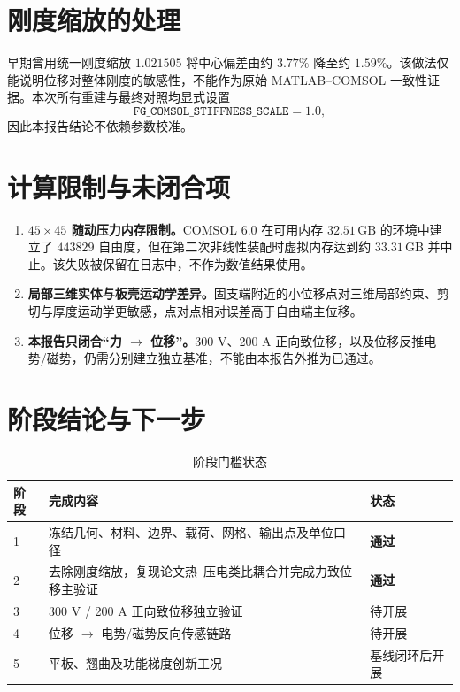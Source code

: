 \documentclass[UTF8,fontset=windows,12pt,a4paper]{ctexart}
\newcommand{\pass}{\textcolor{passgreen}{\textbf{通过}}}
\begin{document}
\section{刚度缩放的处理}

早期曾用统一刚度缩放 $1.021505$ 将中心偏差由约 $3.77\%$ 降至约 $1.59\%$。该做法仅能说明位移对整体刚度的敏感性，不能作为原始 MATLAB--COMSOL 一致性证据。本次所有重建与最终对照均显式设置
\[
  \texttt{FG\_COMSOL\_STIFFNESS\_SCALE}=1.0,
\]
因此本报告结论不依赖参数校准。

\section{计算限制与未闭合项}

\begin{enumerate}[label=\arabic*.]
  \item \textbf{$45\times45$ 随动压力内存限制。}COMSOL 6.0 在可用内存 $32.51\,\mathrm{GB}$ 的环境中建立了 $443829$ 自由度，但在第二次非线性装配时虚拟内存达到约 $33.31\,\mathrm{GB}$ 并中止。该失败被保留在日志中，不作为数值结果使用。
  \item \textbf{局部三维实体与板壳运动学差异。}固支端附近的小位移点对三维局部约束、剪切与厚度运动学更敏感，点对点相对误差高于自由端主位移。
  \item \textbf{本报告只闭合“力 $\rightarrow$ 位移”。}300 V、200 A 正向致位移，以及位移反推电势/磁势，仍需分别建立独立基准，不能由本报告外推为已通过。
\end{enumerate}

\section{阶段结论与下一步}

\begin{table}[H]
\centering
\caption{阶段门槛状态}
\begin{tabularx}{\textwidth}{lXl}
\toprule
阶段 & 完成内容 & 状态 \\
\midrule
1 & 冻结几何、材料、边界、载荷、网格、输出点及单位口径 & \pass \\
2 & 去除刚度缩放，复现论文热--压电类比耦合并完成力致位移主验证 & \pass \\
3 & 300 V / 200 A 正向致位移独立验证 & 待开展 \\
4 & 位移 $\rightarrow$ 电势/磁势反向传感链路 & 待开展 \\
5 & 平板、翘曲及功能梯度创新工况 & 基线闭环后开展 \\
\bottomrule
\end{tabularx}
\end{table}
\end{document}
